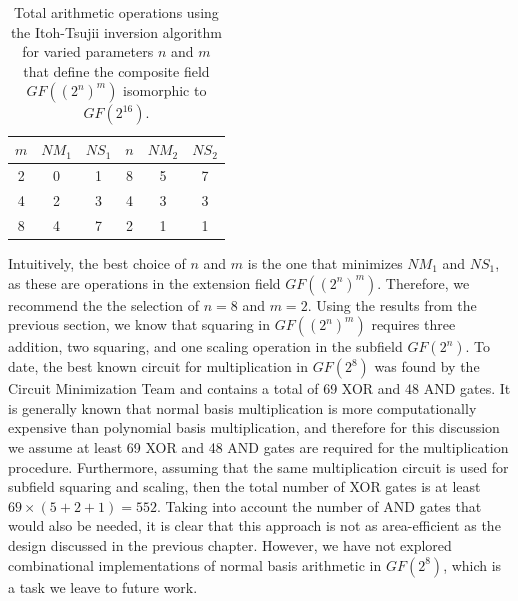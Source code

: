 \begin{table}[h]
\begin{center}
\label{tab:itaOperations}
\caption{Total arithmetic operations using the Itoh-Tsujii inversion algorithm for varied parameters $n$ and $m$ that define the composite field $GF((2^n)^m)$ isomorphic to $GF(2^{16})$.}
\begin{tabular}{|c|c|c||c|c|c|} \hline
	$m$ & $NM_1$ & $NS_1$ & $n$ & $NM_2$ & $NS_2$ \\ \hline
	2 & 0 & 1 & 8 & 5 & 7 \\ 
	4 & 2 & 3 & 4 & 3 & 3 \\
	8 & 4 & 7 & 2 & 1 & 1 \\ \hline 
\end{tabular}
\end{center}
\end{table}
Intuitively, the best choice of $n$ and $m$ is the one that minimizes $NM_1$ and $NS_1$, as these are operations in the extension field $GF((2^n)^m)$. Therefore, we recommend the the selection of $n = 8$ and $m = 2$. Using the results from the previous section, we know that squaring in $GF((2^n)^m)$ requires three addition, two squaring, and one scaling operation in the subfield $GF(2^n)$. To date, the best known circuit for multiplication in $GF(2^8)$ was found by the Circuit Minimization Team \cite{CMT} and contains a total of 69 XOR and 48 AND gates. It is generally known that normal basis multiplication is more computationally expensive than polynomial basis multiplication, and therefore for this discussion we assume at least 69 XOR and 48 AND gates are required for the multiplication procedure. Furthermore, assuming that the same multiplication circuit is used for subfield squaring and scaling, then the total number of XOR gates is at least $69 \times (5 + 2 + 1) = 552$. Taking into account the number of AND gates that would also be needed, it is clear that this approach is not as area-efficient as the design discussed in the previous chapter. However, we have not explored combinational implementations of normal basis arithmetic in $GF(2^8)$, which is a task we leave to future work.

